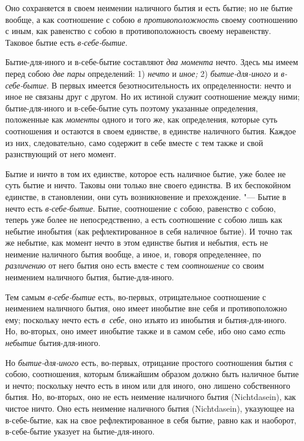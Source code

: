 Оно сохраняется в своем неимении наличного бытия и есть бытие; но не бытие
вообще, а как соотношение с собою {\em в
противоположность} своему соотношению с иным, как равенство с собою в
противоположность своему неравенству. Таковое бытие есть
{\em в-себе-бытие}.

Бытие-для-иного и в-себе-бытие составляют {\em два
момента} нечто. Здесь мы имеем перед собою {\em две
пары} определений: 1) {\em нечто} и
{\em иное;} 2) {\em бытие-для-иного} и {\em в-себе-бытие}. В первых имеется
безотносительность их определенности: нечто и иное не связаны друг с
другом. Но их истиной служит соотношение между ними; бытие-для-иного и
в-себе-бытие суть поэтому указанные определения, положенные как
{\em моменты} одного и того же, как определения,
которые суть соотношения и остаются в своем единстве, в единстве наличного
бытия. Каждое из них, следовательно, само содержит в себе вместе с тем
также и свой разнствующий от него момент.

Бытие и ничто в том их единстве, которое есть наличное бытие, уже более не
суть бытие и ничто. Таковы они только вне своего единства. В их беспокойном
единстве, в становлении, они суть возникновение и прехождение. "--- Бытие в
нечто есть {\em в-себе-бытие}. Бытие, соотношение с
собою, равенство с собою, теперь уже более не непосредственно, а есть
соотношение с собою лишь как небытие инобытия (как рефлектированное в себя
наличное бытие). И точно так же небытие, как момент нечто в этом единстве
бытия и небытия, есть не неимение наличного бытия вообще, а иное, и,
говоря определеннее, по {\em различению} от него бытия
оно есть вместе с тем {\em соотношение} со своим
неимением наличного бытия, бытие-для-иного.

Тем самым {\em в-себе-бытие} есть, во-первых,
отрицательное соотношение с неимением наличного бытия, оно имеет инобытие
вне себя и противоположно ему; поскольку нечто есть
{\em в~себе}, оно изъято из инобытия и бытия-для-иного.
Но, во-вторых, оно имеет инобытие также и в самом себе, ибо оно
само {\em есть небытие} бытия-для-иного.

Но {\em бытие-для-иного} есть, во-первых, отрицание
простого соотношения бытия с собою, соотношения, которым ближайшим образом
должно быть наличное бытие и нечто; поскольку нечто есть в ином
или для иного, оно лишено собственного бытия. Но, во-вторых,
оно не есть неимение наличного бытия (Nicht\-dasein), как чистое ничто. Оно
есть неимение наличного бытия (Nicht\-dasein), указующее на в-себе-бытие, как
на свое рефлектированное в себя бытие, равно как и наоборот, в-себе-бытие
указует на бытие-для-иного.

